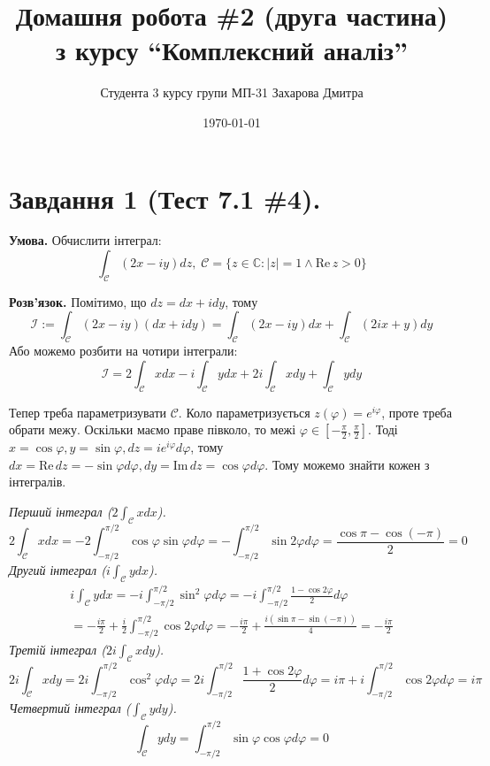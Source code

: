 \documentclass[14pt]{extarticle}
\title{Домашня робота \#2 (друга частина) з курсу ``Комплексний аналіз''}
\author{Студента 3 курсу групи МП-31 Захарова Дмитра}
\date{\today}
\begin{document}
\maketitle

\section*{Завдання 1 (Тест 7.1 \#4).}

\textbf{Умова.} Обчислити інтеграл:
\[
\int_{\mathcal{C}} (2x-iy)dz, \; \mathcal{C} = \{z \in \mathbb{C}: |z| = 1 \wedge \text{Re}\, z > 0\}
\]

\textbf{Розв'язок.} Помітимо, що $dz=dx+idy$, тому
\[
\mathcal{I} := \int_{\mathcal{C}} (2x-iy)(dx+idy) = \int_{\mathcal{C}}(2x - iy)dx + \int_{\mathcal{C}} (2ix + y)dy
\]
Або можемо розбити на чотири інтеграли:
\[
\mathcal{I} = 2\int_{\mathcal{C}}xdx - i\int_{\mathcal{C}}ydx + 2i\int_{\mathcal{C}}xdy + \int_{\mathcal{C}} ydy
\]

Тепер треба параметризувати $\mathcal{C}$. Коло параметризується $z(\varphi) = e^{i\varphi}$, проте треба обрати межу. Оскільки маємо праве півколо, то межі $\varphi \in \left[-\frac{\pi}{2},\frac{\pi}{2}\right]$. Тоді $x=\cos\varphi, y = \sin\varphi, dz=ie^{i\varphi}d\varphi$, тому $dx=\text{Re} \, dz=-\sin\varphi d\varphi, dy=\text{Im}\, dz = \cos\varphi d\varphi$. Тому можемо знайти кожен з інтегралів.

\textit{Перший інтеграл ($2\int_{\mathcal{C}}xdx$).}
\[
2\int_{\mathcal{C}} xdx = -2\int_{-\pi/2}^{\pi/2}\cos\varphi\sin\varphi d\varphi = -\int_{-\pi/2}^{\pi/2} \sin 2\varphi d\varphi = \frac{\cos \pi - \cos(-\pi)}{2} = 0
\]
\textit{Другий інтеграл ($i\int_{\mathcal{C}}ydx$).}
\begin{align*}
i\int_{\mathcal{C}}ydx = -i\int_{-\pi/2}^{\pi/2}\sin^2\varphi d\varphi = -i \int_{-\pi/2}^{\pi/2} \frac{1-\cos 2\varphi}{2}d\varphi \\ = -\frac{i\pi}{2} + \frac{i}{2}\int_{-\pi/2}^{\pi/2}\cos 2\varphi d\varphi = -\frac{i\pi}{2} + \frac{i(\sin \pi - \sin(-\pi))}{4} = -\frac{i\pi}{2}
\end{align*}
\textit{Третій інтеграл ($2i\int_{\mathcal{C}}xdy$).}
\[
2i\int_{\mathcal{C}}xdy = 2i \int_{-\pi/2}^{\pi/2} \cos^2\varphi d\varphi = 2i \int_{-\pi/2}^{\pi/2} \frac{1+\cos 2\varphi}{2}d\varphi = i\pi + i \int_{-\pi/2}^{\pi/2}\cos 2 \varphi d\varphi = i\pi
\]
\textit{Четвертий інтеграл ($\int_{\mathcal{C}} ydy$).}
\[
\int_{\mathcal{C}}ydy = \int_{-\pi/2}^{\pi/2} \sin\varphi \cos\varphi d\varphi = 0
\]
\end{document}
